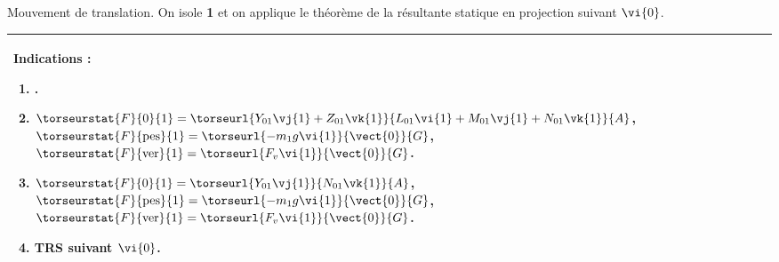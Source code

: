 \ifprof
Mouvement de translation. On isole \textbf{1} et on applique le théorème de la résultante statique en projection suivant $\vi{0}$.
\else
\fi



\ifprof
\else
\ifcolle
\else
\footnotesize
\begin{marginfigure}
\begin{tabular}{|p{.9\linewidth}|}
\hline
Indications :
\begin{enumerate}
\item .
\item $\torseurstat{F}{0}{1}=\torseurl{Y_{01}\vj{1}+Z_{01}\vk{1}}{L_{01}\vi{1}+M_{01}\vj{1}+N_{01}\vk{1}}{A}$,
$\torseurstat{F}{\text{pes}}{1}=\torseurl{-m_1g\vi{1}}{\vect{0}}{G}$, 
$\torseurstat{F}{\text{ver}}{1}=\torseurl{F_v\vi{1}}{\vect{0}}{G}$.
\item $\torseurstat{F}{0}{1}=\torseurl{Y_{01}\vj{1}}{N_{01}\vk{1}}{A}$,
$\torseurstat{F}{\text{pes}}{1}=\torseurl{-m_1g\vi{1}}{\vect{0}}{G}$,
$\torseurstat{F}{\text{ver}}{1}=\torseurl{F_v\vi{1}}{\vect{0}}{G}$.
\item TRS suivant $\vi{0}$.
\end{enumerate} \\ \hline
\end{tabular}
\end{marginfigure}
\normalsize
\fi



\fi


